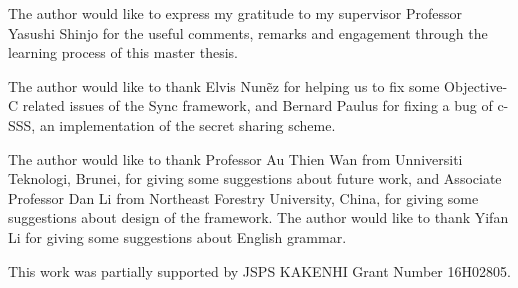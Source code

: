 \documentclass[a4paper,11pt]{report}
\begin{document}
The author would like to express my gratitude to my supervisor Professor Yasushi Shinjo for the useful comments, remarks and engagement through the learning process of this master thesis.

The author would like to thank Elvis Nun{\~e}z for helping us to fix some Objective-C related issues of the Sync framework, and Bernard Paulus for fixing a bug of c-SSS, an implementation of the secret sharing scheme.

The author would like to thank Professor Au Thien Wan from Unniversiti Teknologi, Brunei, for giving some suggestions about future work, and Associate Professor Dan Li from Northeast Forestry University, China, for giving some suggestions about design of the framework.
The author would like to thank Yifan Li for giving some suggestions about English grammar.

This work was partially supported by JSPS KAKENHI Grant Number 16H02805.

\newpage

\renewcommand{\bibname}{Bibliography}
%
%


 
\end{document}

